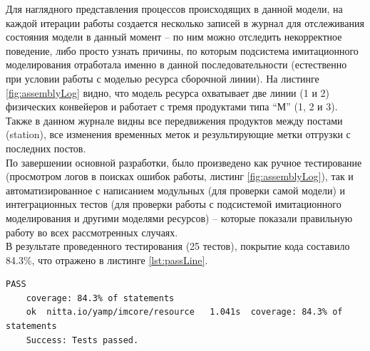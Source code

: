 \indent Для наглядного представления процессов происходящих в данной модели, на каждой итерации работы создается несколько записей в журнал для отслеживания состояния модели в данный момент -- по ним можно отследить некорректное поведение, либо просто узнать причины, по которым подсистема имитационного моделирования отработала именно в данной последовательности (естественно при условии работы с моделью ресурса сборочной линии).
На листинге \ref{fig:assemblyLog} видно, что модель ресурса охватывает две линии (1 и 2) физических конвейеров и работает с тремя продуктами типа ``М'' (1, 2 и 3).
Также в данном журнале видны все передвижения продуктов между постами (station), все изменения временных меток и результирующие метки отгрузки с последних постов.\\
\indent По завершении основной разработки, было произведено как ручное тестирование (просмотром логов в поисках ошибок работы, листинг \ref{fig:assemblyLog}), так и автоматизированное с написанием модульных (для проверки самой модели) и интеграционных тестов (для проверки работы с подсистемой имитационного моделирования и другими моделями ресурсов) -- которые показали правильную работу во всех рассмотренных случаях.\\

\indent В результате проведенного тестирования (25 тестов), покрытие кода составило 84.3\%, что отражено в листинге \ref{lst:passLine}.

\begin{lstlisting}[caption={Тестовое покрытие кода},label={lst:passLine}]
	PASS
	coverage: 84.3% of statements
	ok	nitta.io/yamp/imcore/resource	1.041s	coverage: 84.3% of statements
	Success: Tests passed.
\end{lstlisting}
